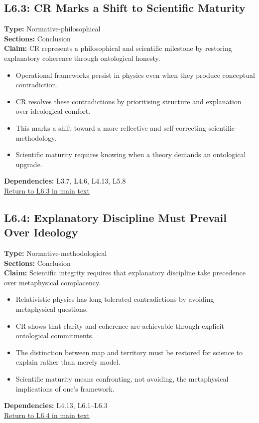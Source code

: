 \documentclass[12pt]{book}
\newcommand{\returnlink}[1]{\hyperref[logic:#1]{Return to #1 in main text}\xspace}
\begin{document}
\subsection*{L6.3: CR Marks a Shift to Scientific Maturity}
\label{appendix:L6.3}
\textbf{Type:} Normative-philosophical \\
\textbf{Sections:} Conclusion \\
\textbf{Claim:} CR represents a philosophical and scientific milestone by restoring explanatory coherence through ontological honesty.
\begin{itemize}
  \item Operational frameworks persist in physics even when they produce conceptual contradiction.
  \item CR resolves these contradictions by prioritising structure and explanation over ideological comfort.
  \item This marks a shift toward a more reflective and self-correcting scientific methodology.
  \item Scientific maturity requires knowing when a theory demands an ontological upgrade.
\end{itemize}
\textbf{Dependencies:} L3.7, L4.6, L4.13, L5.8 \\
\returnlink{L6.3}

\subsection*{L6.4: Explanatory Discipline Must Prevail Over Ideology}
\label{appendix:L6.4}
\textbf{Type:} Normative-methodological \\
\textbf{Sections:} Conclusion \\
\textbf{Claim:} Scientific integrity requires that explanatory discipline take precedence over metaphysical complacency.
\begin{itemize}
  \item Relativistic physics has long tolerated contradictions by avoiding metaphysical questions.
  \item CR shows that clarity and coherence are achievable through explicit ontological commitments.
  \item The distinction between map and territory must be restored for science to explain rather than merely model.
  \item Scientific maturity means confronting, not avoiding, the metaphysical implications of one's framework.
\end{itemize}
\textbf{Dependencies:} L4.13, L6.1–L6.3 \\
\returnlink{L6.4}
\end{document}
